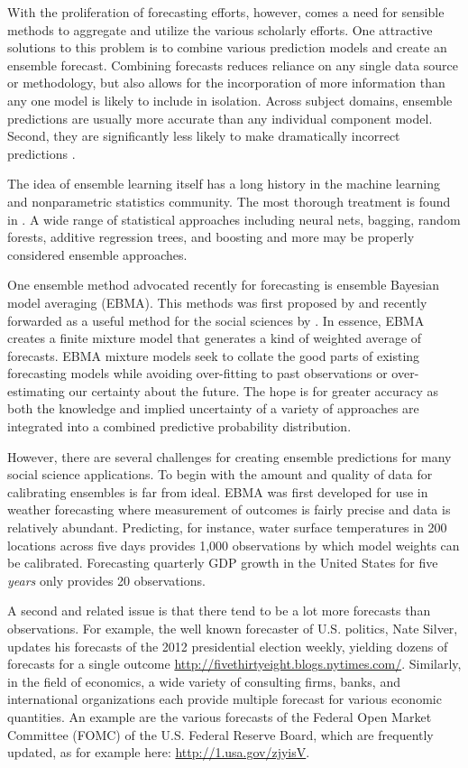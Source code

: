 \documentclass[12pt,fullpage,endnotes]{article}
\begin{document}
With the proliferation of forecasting efforts, however, comes a need
for sensible methods to aggregate and utilize the various scholarly
efforts.  One attractive solutions to this problem is to combine
various prediction models and create an ensemble forecast.  Combining
forecasts reduces reliance on any single data source or methodology,
but also allows for the incorporation of more information than any one
model is likely to include in isolation.  Across subject domains,
ensemble predictions are usually more accurate than any individual
component model. Second, they are significantly less likely to make
dramatically incorrect predictions \citep{Bates:1969,Armstrong:2001,Raftery:2005}.

The idea of ensemble learning itself has a long history in the machine
learning and nonparametric statistics community. The most thorough
treatment is found in \citet{Hastie:2009}. A wide range of statistical
approaches including neural nets, bagging, random forests, additive
regression trees, and boosting and more may be properly considered
ensemble approaches.  

One ensemble method advocated recently for forecasting is ensemble
Bayesian model averaging (EBMA). This methods was first proposed by
\citet{Raftery:2005} and recently forwarded as a useful method for the
social sciences by \citet{mhw:2012}. In essence, EBMA creates a
finite mixture model that generates a kind of weighted average of
forecasts.  EBMA mixture models seek to collate the good parts of
existing forecasting models while avoiding over-fitting to past
observations or over-estimating our certainty about the future.  The
hope is for greater accuracy as both the knowledge and implied
uncertainty of a variety of approaches are integrated into a combined
predictive probability distribution.

However, there are several challenges for creating ensemble
predictions for many social science applications.  To begin with the
amount and quality of data for calibrating ensembles is far from
ideal.  EBMA was first developed for use in weather forecasting where
measurement of outcomes is fairly precise and data is relatively
abundant.  Predicting, for instance, water surface temperatures in 200
locations across five days provides 1,000 observations by which model
weights can be calibrated.  Forecasting quarterly GDP
growth in the United States for five \textit{years} only provides 20 observations.

A second and related issue is that there tend to be a lot more
forecasts than observations.  For example, the well known forecaster of U.S. politics, Nate Silver,
updates his forecasts of the 2012 presidential election weekly, yielding dozens of forecasts
for a single outcome \url{http://fivethirtyeight.blogs.nytimes.com/}.  Similarly, in the field of economics, a wide variety of consulting firms, banks, and international organizations each provide multiple
forecast for various economic quantities. An example are the various forecasts of the Federal Open Market Committee (FOMC) of the U.S. Federal Reserve Board, which are frequently updated, as for example here: \url{http://1.usa.gov/zjyisV}.
\end{document}
